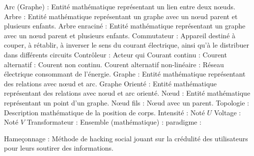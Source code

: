 Arc (Graphe) : Entité mathématique représentant un lien entre deux nœuds.
Arbre : Entité mathématique représentant un graphe avec un nœud parent et plusieurs enfants.
Arbre enraciné : Entité mathématique représentant un graphe avec un nœud parent et plusieurs enfants.
Commutateur : Appareil destiné à couper, à rétablir, à inverser le sens du courant électrique, ainsi qu'à le distribuer dans différents circuits
Contrôleur : Acteur qui
Courant continu :
Courent alternatif : Courent non continu.
Courent alternatif non-linéaire : Réseau électrique consommant de l'énergie.
Graphe : Entité mathématique représentant des relations avec nœud et arc.
Graphe Orienté : Entité mathématique représentant des relations avec nœud et arc orienté.
Nœud : Entité mathématique représentant un point d'un graphe.
Nœud fils : Nœud avec un parent.
Topologie : Description mathématique de la position de corps.
Intensité : Noté $U$
Voltage : Noté $V$
Transformateur :
Ensemble (mathématique) :
paradigme :

Hameçonnage : Méthode de hacking social jouant sur la crédulité des utilisateurs pour leurs soutirer des informations.